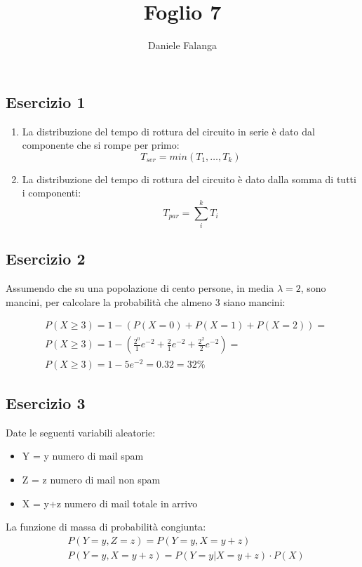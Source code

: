 \documentclass[12pt]{article}
\title{\textbf{Foglio 7}}
\author{Daniele Falanga}
\date{}
\begin{document}
\maketitle

\subsection*{Esercizio 1}

\begin{enumerate}
    \item La distribuzione del tempo di rottura del circuito in serie è dato dal componente che si rompe per primo:
    \[
    T_{ser} = min(T_1,\dots,T_k)    
    \]
    \item La distribuzione del tempo di rottura del circuito è dato dalla somma di tutti i componenti:
    \[
    T_{par} = \sum_{i}^{k}T_i    
    \]
\end{enumerate}

\subsection*{Esercizio 2}
Assumendo che su una popolazione di cento persone, in media \(\lambda = 2\), sono mancini, per calcolare la probabilità che almeno 3 siano mancini:

\begin{align*}
    &P(X \ge 3) = 1 - (P(X = 0) + P(X = 1) + P(X = 2)) = \\    
    &P(X \ge 3) = 1 - (\frac{2^0}{1}e^{-2} + \frac{2}{1}e^{-2} + \frac{2^2}{2}e^{-2}) = \\
    &P(X \ge 3) = 1-5e^{-2} = 0.32 = 32\%
\end{align*}  

\newpage
\subsection*{Esercizio 3}
Date le seguenti variabili aleatorie:
\begin{itemize}
    \item Y = y numero di mail spam 
    \item Z = z numero di mail non spam
    \item X = y+z numero di mail totale in arrivo  
\end{itemize}

La funzione di massa di probabilità congiunta:
\begin{align*}
    &P(Y=y, Z=z) = P(Y=y, X = y+z) \\
    &P(Y=y, X = y+z) = P(Y=y|X = y+z)\cdot P(X) \\    
\end{align*}
\end{document}
